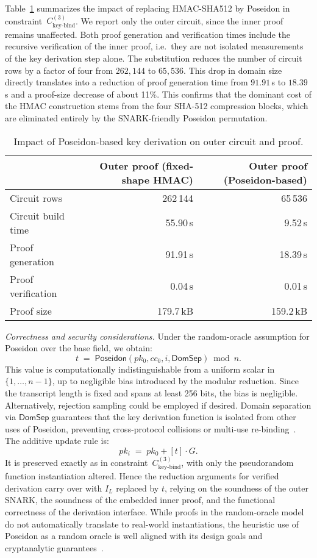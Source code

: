 Table~\ref{tab:poseidon-comparison} summarizes the impact of replacing HMAC-SHA512 by Poseidon in constraint~$C_{\text{key-bind}}^{(3)}$. We report only the outer circuit, since the inner proof remains unaffected. Both proof generation and verification times include the recursive verification of the inner proof, i.e.\ they are not isolated measurements of the key derivation step alone. The substitution reduces the number of circuit rows by a factor of four from $262,144$ to $65,536$.  This drop in domain size directly translates into a reduction of proof generation time from $91.91$\,s to $18.39$\,s and a proof-size decrease of about 11\%. This confirms that the dominant cost of the HMAC construction stems from the four SHA-512 compression blocks, which are eliminated entirely by the SNARK-friendly Poseidon permutation.

\begin{table}[t]
	\centering
	\begin{tabular}{lrr}
		\toprule
		& \textbf{Outer proof (fixed-shape HMAC)} & \textbf{Outer proof (Poseidon-based)} \\
		\midrule
		Circuit rows        & 262\,144    & 65\,536 \\
		Circuit build time  & 55.90\,s    & 9.52\,s \\
		Proof generation    & 91.91\,s    & 18.39\,s \\
		Proof verification  & 0.04\,s     & 0.01\,s \\
		Proof size          & 179.7\,kB   & 159.2\,kB \\
		\bottomrule
	\end{tabular}
	\caption{Impact of Poseidon-based key derivation on outer circuit and proof.}
	\label{tab:poseidon-comparison}
\end{table}

\medskip
\noindent\emph{Correctness and security considerations.}
Under the random-oracle assumption for Poseidon over the base field, we obtain:
\[
t \;=\; \mathsf{Poseidon}(pk_0, cc_0, i, \mathsf{DomSep}) \bmod n.
\]
This value is computationally indistinguishable from a uniform scalar in $\{1,\dots,n-1\}$, up to negligible bias introduced by the modular reduction. Since the transcript length is fixed and spans at least 256 bits, the bias is negligible. Alternatively, rejection sampling could be employed if desired. Domain separation via $\mathsf{DomSep}$ guarantees that the key derivation function is isolated from other uses of Poseidon, preventing cross-protocol collisions or multi-use re-binding~\cite{cryptoeprint:2019/458}. The additive update rule is:
\[
pk_i \;=\; pk_0 + [t]\cdot G.
\]
It is preserved exactly as in constraint~$C_{\text{key-bind}}^{(3)}$, with only the pseudorandom function instantiation altered. Hence the reduction arguments for verified derivation carry over with $I_L$ replaced by $t$, relying on the soundness of the outer SNARK, the soundness of the embedded inner proof, and the functional correctness of the derivation interface. While proofs in the random-oracle model do not automatically translate to real-world instantiations, the heuristic use of Poseidon as a random oracle is well aligned with its design goals and cryptanalytic guarantees~\cite{cryptoeprint:1998/011}.

